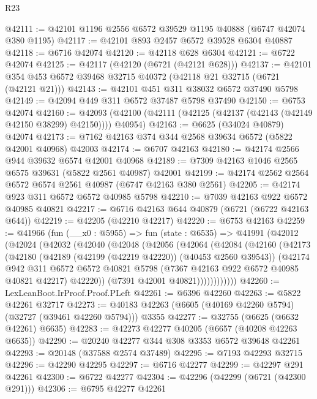 \begin{lexlean}{R23}
\begin{coremodule}
@42111 := @42101 @1196 @2556 @6572 @39529 @1195 @40888 (@6747 @42074 @380 @1195)
@42117 := @42101 @893 @2457 @6572 @39528 @6304 @40887
@42118 := @6716 @42074
@42120 := @42118 @628 @6304
@42121 := @6722 @42074
@42125 := @42117 (@42120 (@6721 (@42121 @628)))
@42137 := @42101 @354 @453 @6572 @39468 @32715 @40372 (@42118 @21 @32715 (@6721 (@42121 @21)))
@42143 := @42101 @451 @311 @38032 @6572 @37490 @5798
@42149 := @42094 @449 @311 @6572 @37487 @5798 @37490
@42150 := @6753 @42074
@42160 := @42093 (@42100 (@42111 (@42125 (@42137 (@42143 (@42149 @42150 @38299) @42150)))) @40954)
@42163 := @6625 (@34024 @40879) @42074
@42173 := @7162 @42163 @374 @344 @2568 @39634 @6572 (@5822 @42001 @40968) @42003
@42174 := @6707 @42163
@42180 := @42174 @2566 @944 @39632 @6574 @42001 @40968
@42189 := @7309 @42163 @1046 @2565 @6575 @39631 (@5822 @2561 @40987) @42001
@42199 := @42174 @2562 @2564 @6572 @6574 @2561 @40987 (@6747 @42163 @380 @2561)
@42205 := @42174 @923 @311 @6572 @6572 @40985 @5798
@42210 := @7039 @42163 @922 @6572 @40985 @40821
@42217 := @6716 @42163 @644 @40879 (@6721 (@6722 @42163 @644))
@42219 := @42205 (@42210 @42217)
@42220 := @6753 @42163
@42259 := @41966
    (fun (__x0 : @5955) =>
    fun (state : @6535) =>
    @41991
      (@42012
        (@42024
          (@42032
            (@42040
              (@42048
                (@42056
                  (@42064
                    (@42084
                      (@42160
                        (@42173
                          (@42180
                            (@42189 (@42199 (@42219 @42220)) (@40453 @2560 @39543))
                            (@42174
                              @942
                              @311
                              @6572
                              @6572
                              @40821
                              @5798
                              (@7367 @42163 @922 @6572 @40985 @40821 @42217)
                              @42220))
                          (@7391 @42001 @40821))))))))))))
@42260 := LexLeanBoot.IrProof.Proof.PLeft
@42261 := @6396 @42260
@42263 := @5822 @42261 @32717
@42273 := @40183 @42263 (@6605 (@40169 @42260 @5794) (@32727 (@39461 @42260 @5794))) @3355
@42277 := @32755 (@6625 (@6632 @42261) @6635)
@42283 := @42273 @42277 @40205 (@6657 (@40208 @42263 @6635))
@42290 := @20240 @42277 @344 @308 @3353 @6572 @39648 @42261
@42293 := @20148 (@37588 @2574 @37489)
@42295 := @7193 @42293 @32715
@42296 := @42290 @42295
@42297 := @6716 @42277
@42299 := @42297 @291 @42261
@42300 := @6722 @42277
@42304 := @42296 (@42299 (@6721 (@42300 @291)))
@42306 := @6795 @42277 @42261

\end{coremodule}
\end{lexlean}
